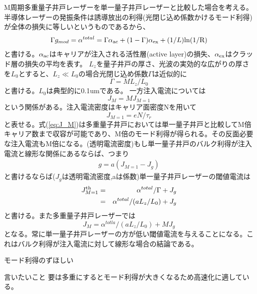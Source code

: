 M周期多重量子井戸レーザーを単一量子井戸レーザーと比較した場合を考える。
半導体レーザーの発振条件は誘導放出の利得(光閉じ込め係数かけるモード利得)が全体の損失に等しいというものであるから、
\begin{eqnarray}
\Gamma g_{mod}=\alpha^{total}= \Gamma \alpha_{\rm{ac}} +(1-\Gamma)\alpha_{\rm{ex}}+(1/L)\rm{ln}(1/R)
\end{eqnarray}
と書ける。$\alpha_{\rm{ac}}$はキャリアが注入される活性層(active layer)の損失、$\alpha_{\rm{ex}}$はクラッド層の損失の平均を表す。
$L_{z}$を量子井戸の厚さ、光波の実効的な広がりの厚さを$L_{0}$とすると、$L_{z}\ll L_{0}$の場合光閉じ込め係数$\Gamma$は近似的に
\begin{equation}
\Gamma = ML_{z}/L_{0}
\end{equation}
と書ける。$L_{0}$は典型的に0.1umである。
一方注入電流については
\begin{equation}
J_{M}=MJ_{M=1}
\label{eq:J_M}
\end{equation}
という関係がある。注入電流密度はキャリア面密度Nを用いて
\begin{equation}
J_{M=1}=eN/\tau_{r}
\end{equation}
と表せる。式(\ref{eq:J_M})は多重量子井戸においては単一量子井戸と比較してM倍キャリア数まで収容が可能であり、M倍のモード利得が得られる。その反面必要な注入電流もM倍になる。(透明電流密度)もし単一量子井戸のバルク利得が注入電流と線形な関係にあるならば、つまり
\begin{eqnarray}
g=a(J_{M=1}-J_{g})
\end{eqnarray}
と書けるならば($J_{g}$は透明電流密度,aは係数)単一量子井戸レーザーの閾値電流は
\begin{eqnarray}
J^{\rm{th}}_{M=1}&=&\alpha^{total}/ \Gamma + J_{g}\nonumber\\
&=&\alpha^{total}/(aL_{z}/L_{0})+J_{g} 
\end{eqnarray}
と書ける。また多重量子井戸レーザーでは
\begin{equation}
J_{M}=\alpha^{totla}/(aL_{z}/L_{0}) + MJ_{g}
\end{equation}
となる。常に単一量子井戸レーザーの方が低い閾値電流を与えることになる。これはバルク利得が注入電流に対して線形な場合の結論である。


モード利得のずほしい


言いたいこと
要は多重にするとモード利得が大きくなるため高速化に適している。

